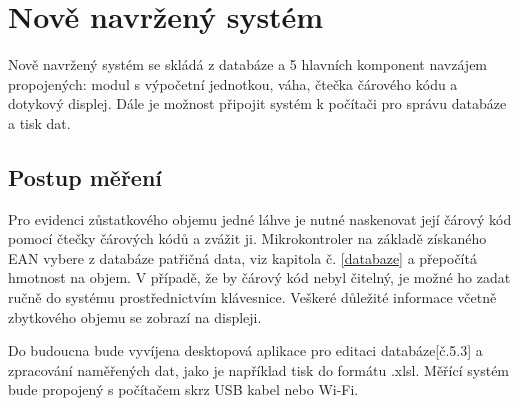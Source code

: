 \chapter{Nově navržený systém}
\label{Nově navržený systém}
Nově navržený systém se skládá z databáze a 5 hlavních komponent navzájem propojených: modul s výpočetní jednotkou, váha, čtečka čárového kódu a dotykový displej. Dále je možnost připojit systém k počítači pro správu databáze a tisk dat. 

\section{Postup měření}%
Pro evidenci zůstatkového objemu jedné láhve je nutné naskenovat její čárový kód pomocí čtečky čárových kódů a zvážit ji. Mikrokontroler na základě získaného EAN vybere z databáze patřičná data, viz kapitola č. \ref{databaze} a přepočítá hmotnost na objem. V případě, že by čárový kód nebyl čitelný, je možné ho zadat ručně do systému prostřednictvím klávesnice. Veškeré důležité informace včetně zbytkového objemu se zobrazí na displeji. %

Do budoucna bude vyvíjena desktopová aplikace pro editaci databáze[č.5.3] a zpracování naměřených dat, jako je například tisk do formátu .xlsl. Měřící systém bude propojený s počítačem skrz USB kabel nebo Wi-Fi.

